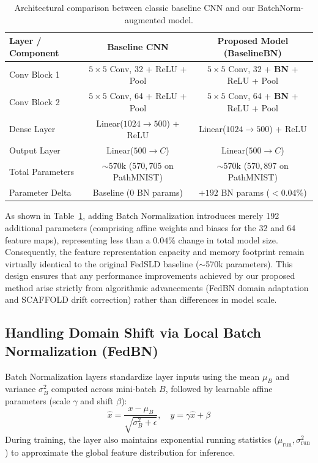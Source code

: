 \begin{table}[htbp]
\centering
\small
\setlength{\tabcolsep}{4.5pt}
\caption{Architectural comparison between classic baseline CNN and our BatchNorm-augmented model.}
\label{tab:model_architecture_comparison}
\begin{tabular}{lcc}
\toprule
\textbf{Layer / Component} & \textbf{Baseline CNN \cite{luo2022fedsld}} & \textbf{Proposed Model (BaselineBN)} \\
\midrule
Conv Block 1 & $5 \times 5$ Conv, 32 + ReLU + Pool & $5 \times 5$ Conv, 32 + \textbf{BN} + ReLU + Pool \\
Conv Block 2 & $5 \times 5$ Conv, 64 + ReLU + Pool & $5 \times 5$ Conv, 64 + \textbf{BN} + ReLU + Pool \\
Dense Layer & Linear($1024 \to 500$) + ReLU & Linear($1024 \to 500$) + ReLU \\
Output Layer & Linear($500 \to C$) & Linear($500 \to C$) \\
Total Parameters & $\sim 570\text{k}$ ($570,705$ on PathMNIST) & $\sim 570\text{k}$ ($570,897$ on PathMNIST) \\
Parameter Delta & Baseline ($0$ BN params) & $+192$ BN params ($< 0.04\%$) \\
\bottomrule
\end{tabular}
\end{table}

As shown in Table~\ref{tab:model_architecture_comparison}, adding Batch Normalization introduces merely 192 additional parameters (comprising affine weights and biases for the 32 and 64 feature maps), representing less than a $0.04\%$ change in total model size. Consequently, the feature representation capacity and memory footprint remain virtually identical to the original FedSLD baseline ($\sim$570k parameters). This design ensures that any performance improvements achieved by our proposed method arise strictly from algorithmic advancements (FedBN domain adaptation and SCAFFOLD drift correction) rather than differences in model scale.

\subsection{Handling Domain Shift via Local Batch Normalization (FedBN)}
\label{subsec:fedbn_formulation}

Batch Normalization layers standardize layer inputs using the mean $\mu_B$ and variance $\sigma_B^2$ computed across mini-batch $B$, followed by learnable affine parameters (scale $\gamma$ and shift $\beta$):
\begin{equation}
    \hat{x} = \frac{x - \mu_B}{\sqrt{\sigma_B^2 + \epsilon}}, \quad y = \gamma \hat{x} + \beta
    \label{eq:batchnorm}
\end{equation}
During training, the layer also maintains exponential running statistics ($\mu_{\text{run}}, \sigma_{\text{run}}^2$) to approximate the global feature distribution for inference.

